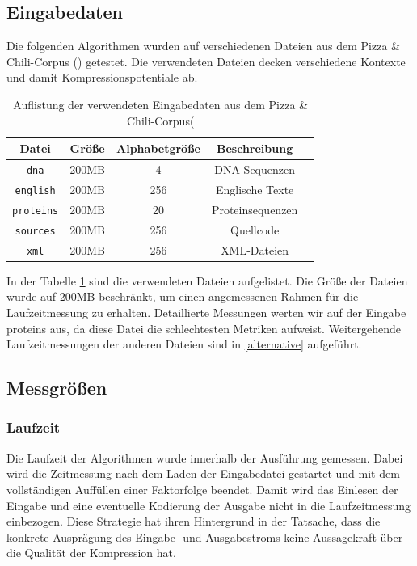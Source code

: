 \subsection{Eingabedaten}
Die folgenden Algorithmen wurden auf verschiedenen Dateien aus dem Pizza \& Chili-Corpus (\cite{corpus}) getestet. Die verwendeten Dateien decken verschiedene Kontexte und damit
Kompressionspotentiale ab.
\begin{table}[ht]
    \centering
    \caption{Auflistung der verwendeten Eingabedaten aus dem Pizza \& Chili-Corpus(\cite{corpus}}
    \label{inputdata}
    \begin{tabular}{|c|c|c|c|c|}
        \hline
        \textbf{Datei} & \textbf{Größe} & \textbf{Alphabetgröße} & \textbf{Beschreibung} \\
        \hline
        \texttt{dna} & 200MB & 4 & DNA-Sequenzen \\
        \hline
        \texttt{english} & 200MB & 256 & Englische Texte \\
        \hline
        \texttt{proteins} & 200MB & 20 & Proteinsequenzen \\
        \hline
        \texttt{sources} & 200MB & 256 & Quellcode \\
        \hline
        \texttt{xml} & 200MB & 256 & XML-Dateien \\
        \hline
    \end{tabular}
\end{table}
In der Tabelle \ref{inputdata} sind die verwendeten Dateien aufgelistet. Die Größe der Dateien wurde auf 200MB beschränkt, um einen angemessenen Rahmen für die 
Laufzeitmessung zu erhalten. Detaillierte Messungen werten wir auf der Eingabe proteins aus, da diese Datei die schlechtesten Metriken aufweist. Weitergehende
Laufzeitmessungen der anderen Dateien sind in \ref{alternative} aufgeführt.

\subsection{Messgrößen}

\subsubsection{Laufzeit}
Die Laufzeit der Algorithmen wurde innerhalb der Ausführung gemessen. Dabei wird die Zeitmessung nach dem Laden der Eingabedatei gestartet und mit dem vollständigen
Auffüllen einer Faktorfolge beendet. Damit wird das Einlesen der Eingabe und eine eventuelle Kodierung der Ausgabe nicht in die Laufzeitmessung einbezogen. Diese Strategie
hat ihren Hintergrund in der Tatsache, dass die konkrete Ausprägung des Eingabe- und Ausgabestroms keine Aussagekraft über die Qualität der Kompression hat.

